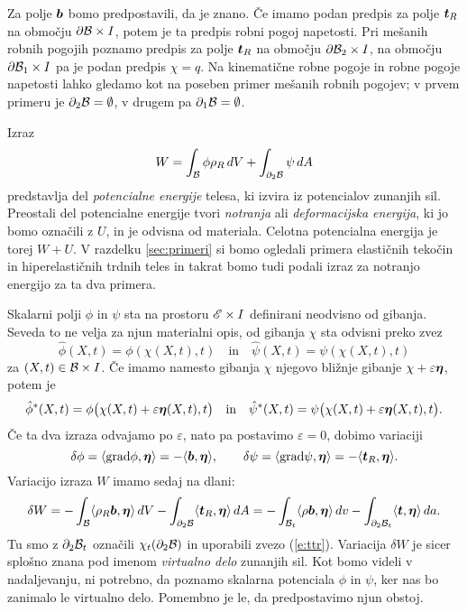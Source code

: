 Za polje $\boldsymbol b$ bomo predpostavili, da je znano.
Če imamo podan predpis za polje $\boldsymbol t_R$ na območju $\partial\mathcal B\times I$, potem je ta predpis
robni pogoj napetosti. Pri mešanih robnih pogojih poznamo predpis za polje $\boldsymbol t_R$ na
območju $\partial\mathcal B_2\times I$, na območju $\partial\mathcal B_1\times I$ pa je podan predpis $\chi=q$.
Na kinematične robne pogoje in robne pogoje napetosti lahko gledamo kot na poseben
primer mešanih robnih pogojev; v prvem primeru je $\partial_2\mathcal B=\emptyset$, v drugem pa
$\partial_1\mathcal B=\emptyset$.

Izraz
\begin{equation*}
	W = \int_{\mathcal B}\phi\rho_R\, dV + \int_{\partial_2 \mathcal B}\psi\, dA
\end{equation*}
predstavlja del \emph{potencialne energije} telesa, ki izvira iz potencialov zunanjih sil.
Preostali del potencialne energije tvori \emph{notranja} ali \emph{deformacijska energija},
ki jo bomo označili z $U$, in je odvisna od materiala. Celotna potencialna energija je torej $W+U$.
V razdelku \ref{sec:primeri} si bomo ogledali primera
elastičnih tekočin in hiperelastičnih trdnih teles in takrat bomo tudi podali izraz
za notranjo energijo za ta dva primera.


Skalarni polji $\phi$ in $\psi$ sta na prostoru $\mathscr E\times I$ definirani neodvisno od gibanja.
Seveda to ne velja za njun materialni opis, od gibanja $\chi$ sta odvisni preko zvez
\[ \hat{\phi}(X,t)=\phi(\chi(X,t),t)\quad\textrm{in}\quad\hat{\psi}(X,t)=\psi(\chi(X,t),t) \]
za $(X,t)\in \mathcal B\times I$.
Če imamo namesto gibanja $\chi$ njegovo bližnje gibanje $\chi+\varepsilon\boldsymbol \eta$, potem je
\[
	\hat{\phi}^*(X,t)=\phi\big(\chi(X,t)+\varepsilon\boldsymbol \eta(X,t),t\big)\quad\textrm{in}
	\quad\hat{\psi}^*(X,t)=\psi\big(\chi(X,t)+\varepsilon\boldsymbol \eta(X,t),t\big).
\]
Če ta dva izraza odvajamo po $\varepsilon$, nato pa postavimo $\varepsilon=0$, dobimo variaciji
\[
	\delta\phi=\langle\mathrm{grad}\phi,\boldsymbol \eta\rangle=-\langle\boldsymbol b,\boldsymbol \eta\rangle,\qquad
	\delta\psi=\langle\mathrm{grad}\psi,\boldsymbol \eta\rangle=-\langle\boldsymbol t_R,\boldsymbol \eta\rangle.
\]
Variacijo izraza $W$ imamo sedaj na dlani:
\begin{equation} \label{e:varvide}
	\delta W = -\int_{\mathcal B}\langle\rho_R\boldsymbol b,\boldsymbol \eta\rangle\, dV
	- \int_{\partial_2 \mathcal B}\langle\boldsymbol t_R,\boldsymbol \eta\rangle\, dA=
	-\int_{\mathcal B_t}\langle\rho\boldsymbol b,\boldsymbol \eta\rangle\, dv
	- \int_{\partial_2 \mathcal B_t}\langle\boldsymbol t,\boldsymbol \eta\rangle\, da.
\end{equation}
Tu smo z $\partial_2 \mathcal B_t$ označili $\chi_t(\partial_2 \mathcal B)$ in uporabili zvezo (\ref{e:ttr}).
Variacija $\delta W$ je sicer splošno znana
pod imenom \emph{virtualno delo} zunanjih sil. Kot bomo videli v nadaljevanju,
ni potrebno, da poznamo skalarna potenciala $\phi$ in $\psi$, ker nas bo zanimalo le virtualno delo.
Pomembno je le, da predpostavimo njun obstoj.


